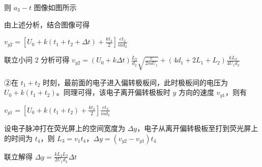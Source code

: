 \documentclass[\gkver]{gaokaozhenti}
\begin{document}
\begin{enumerate}
{则 $a_{3}-t$ 图像如图所示


由上述分析，结合图像可得

$v_{y2} = \left[U_{0} + k(t_{1} + t_{2} + \Delta t) + \frac{kt_{3}}{2}\right]\frac{et_{3}}{md_{2}}$

联立小问 2 分析可得 $v_{y2} = (U_{0} + k\Delta t)\frac{L_{2}}{d_{2}}\sqrt{\frac{e}{2mU_{1}}} + (4d_{1} + 2L_{1} + L_{2})\frac{kL_{2}}{4U_{1}d_{2}}$

②在 $t_{1} + t_{2}$ 时刻，最前面的电子进入偏转极板间，此时极板间的电压为 $U_{0} + k(t_{1} + t_{2})$。同理可得，该电子离开偏转极板时 $y$ 方向的速度 $v_{y1}$，则有

$v_{y1} = \left[U_{0} + k(t_{1} + t_{2}) + \frac{kt_{3}}{2}\right]\frac{et_{3}}{md_{2}}$

设电子脉冲打在荧光屏上的空间宽度为 $\Delta y$，电子从离开偏转极板至打到荧光屏上的时间为 $t_{4}$，则 $L_{3} = v_{1}t_{4}$，$\Delta y = (v_{y2} - v_{y1})t_{4}$

联立解得 $\Delta y = \frac{kL_{2}L_{3}}{2U_{1}d_{2}}\Delta t$
}

\end{enumerate}
\end{document}
